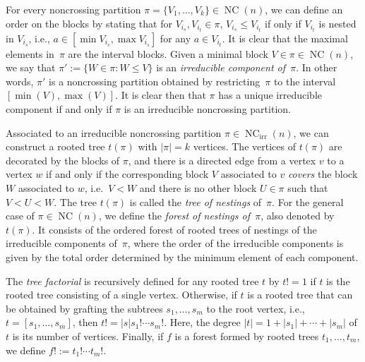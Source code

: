 \documentclass[11pt]{article}
\numberwithin{equation}{section}
\numberwithin{equation}{section}
\newcommand{\NC}{\operatorname{NC}}
\begin{document}
For every noncrossing partition $\pi = \{V_1,\dots,V_k\}\in \NC(n)$, we can define an order on the blocks by stating that for $V_{i_s},V_{i_t} \in \pi$, $V_{i_s}\leq V_{i_t}$ if only if $V_{i_t}$ is nested in $V_{i_s}$, i.e., $a \in [\min{V_{i_s}},\max{V_{i_s}}]$ for any $a \in V_{i_t}$. It is clear that the maximal elements in~$\pi$ are the interval blocks.
Given a minimal block $V\in \pi\in \NC(n)$, we say that $\pi':=\{ W\in \pi\colon W\leq V\}$ is an \textit{irreducible component of~$\pi$}. In other words, $\pi'$ is a noncrossing partition obtained by restricting~$\pi$ to the interval $[\min(V),\max(V)]$. It is clear then that $\pi$ has a unique irreducible component if and only if $\pi$ is an irreducible noncrossing partition.

Associated to an irreducible noncrossing partition $\pi\in \NC_{\mathrm{irr}}(n)$, we can construct a rooted tree $t(\pi)$ with $|\pi| = k$ vertices. The vertices of $t(\pi)$ are decorated by the blocks of $\pi$, and there is a directed edge from a vertex $v$ to a vertex $w$ if and only if the corresponding block $V$ associated to $v$ \textit{covers} the block $W$ associated to $w$, i.e.~$V<W$ and there is no other block $U\in \pi$ such that $V<U<W$. The tree $t(\pi)$ is called the \textit{tree of nestings} of~$\pi$. For the general case of $\pi \in \NC(n)$, we define the \textit{forest of nestings of~$\pi$}, also denoted by~$t(\pi)$. It consists of the ordered forest of rooted trees of nestings of the irreducible components of~$\pi$, where the order of the irreducible components is given by the total order determined by the minimum element of each component.

The \emph{tree factorial} is recursively defined for any rooted tree $t$ by $t! = 1$ if $t$ is the rooted tree consisting of a single vertex. Otherwise, if $t$ is a rooted tree that can be obtained by grafting the subtrees $s_1,\dots,s_m$ to the root vertex, i.e., $t=[s_1,\dots,s_m]$, then
$t! = |s| s_1!\cdots s_m!$.
Here, the degree $|t|=1+|s_1| + \cdots + |s_m|$ of $t$ is its number of vertices. Finally, if $f$ is a forest formed by rooted trees $t_1,\dots,t_m$, we define $f! := t_1!\cdots t_m!$.
\end{document}
